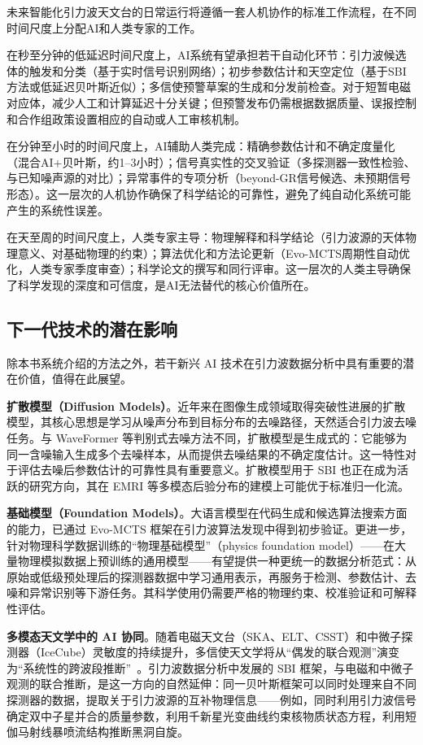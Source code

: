 未来智能化引力波天文台的日常运行将遵循一套人机协作的标准工作流程，在不同时间尺度上分配AI和人类专家的工作。

在秒至分钟的低延迟时间尺度上，AI系统有望承担若干自动化环节：引力波候选体的触发和分类（基于实时信号识别网络）；初步参数估计和天空定位（基于SBI方法或低延迟贝叶斯近似）；多信使预警草案的生成和分发前检查。对于短暂电磁对应体，减少人工和计算延迟十分关键；但预警发布仍需根据数据质量、误报控制和合作组政策设置相应的自动或人工审核机制。

在分钟至小时的时间尺度上，AI辅助人类完成：精确参数估计和不确定度量化（混合AI+贝叶斯，约1--3小时）；信号真实性的交叉验证（多探测器一致性检验、与已知噪声源的对比）；异常事件的专项分析（beyond-GR信号候选、未预期信号形态）。这一层次的人机协作确保了科学结论的可靠性，避免了纯自动化系统可能产生的系统性误差。

在天至周的时间尺度上，人类专家主导：物理解释和科学结论（引力波源的天体物理意义、对基础物理的约束）；算法优化和方法论更新（Evo-MCTS周期性自动优化，人类专家季度审查）；科学论文的撰写和同行评审。这一层次的人类主导确保了科学发现的深度和可信度，是AI无法替代的核心价值所在。

\subsection{下一代技术的潜在影响}

除本书系统介绍的方法之外，若干新兴 AI 技术在引力波数据分析中具有重要的潜在价值，值得在此展望。

\textbf{扩散模型（Diffusion Models）}。近年来在图像生成领域取得突破性进展的扩散模型，其核心思想是学习从噪声分布到目标分布的去噪路径，天然适合引力波去噪任务。与 WaveFormer 等判别式去噪方法不同，扩散模型是生成式的：它能够为同一含噪输入生成多个去噪样本，从而提供去噪结果的不确定度估计。这一特性对于评估去噪后参数估计的可靠性具有重要意义。扩散模型用于 SBI 也正在成为活跃的研究方向，其在 EMRI 等多模态后验分布的建模上可能优于标准归一化流。

\textbf{基础模型（Foundation Models）}。大语言模型在代码生成和候选算法搜索方面的能力，已通过 Evo-MCTS 框架在引力波算法发现中得到初步验证。更进一步，针对物理科学数据训练的“物理基础模型”（physics foundation model）——在大量物理模拟数据上预训练的通用模型——有望提供一种更统一的数据分析范式：从原始或低级预处理后的探测器数据中学习通用表示，再服务于检测、参数估计、去噪和异常识别等下游任务。其科学使用仍需要严格的物理约束、校准验证和可解释性评估。

\textbf{多模态天文学中的 AI 协同}。随着电磁天文台（SKA、ELT、CSST）和中微子探测器（IceCube）灵敏度的持续提升，多信使天文学将从“偶发的联合观测”演变为“系统性的跨波段推断”~\cite{Abbott2017GW170817}。引力波数据分析中发展的 SBI 框架，与电磁和中微子观测的联合推断，是这一方向的自然延伸：同一贝叶斯框架可以同时处理来自不同探测器的数据，提取关于引力波源的互补物理信息——例如，同时利用引力波信号确定双中子星并合的质量参数，利用千新星光变曲线约束核物质状态方程，利用短伽马射线暴喷流结构推断黑洞自旋。

